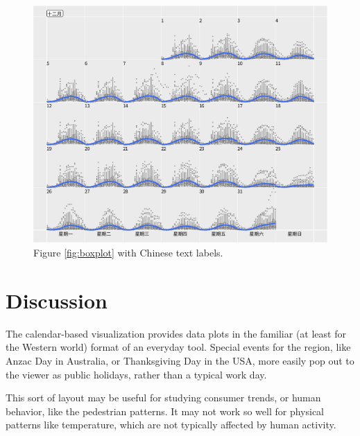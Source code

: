 \documentclass[article]{jss}
\theoremstyle{definition}
\theoremstyle{definition}
\theoremstyle{remark}
\begin{document}
\begin{CodeChunk}
\begin{figure}

{\centering \includegraphics[width=\textwidth]{figure/chn-1} 

}

\caption[Figure \ref{fig:boxplot} with Chinese text labels.]{Figure \ref{fig:boxplot} with Chinese text labels.}\label{fig:chn}
\end{figure}
\end{CodeChunk}



\section{Discussion}\label{discussion}

\label{sec:discussion}

The calendar-based visualization provides data plots in the familiar (at
least for the Western world) format of an everyday tool. Special events
for the region, like Anzac Day in Australia, or Thanksgiving Day in the
USA, more easily pop out to the viewer as public holidays, rather than a
typical work day.

This sort of layout may be useful for studying consumer trends, or human
behavior, like the pedestrian patterns. It may not work so well for
physical patterns like temperature, which are not typically affected by
human activity.


\end{document}
